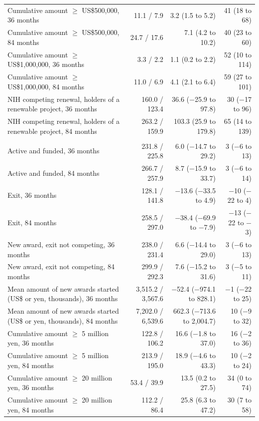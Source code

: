 \begin{table}[H]
\begin{tabularx}{\linewidth}{>{\raggedright\arraybackslash}Xrrr}
Cumulative amount $\geq$ US\$500,000, 36 months & 11.1 / 7.9 & 3.2 (1.5 to 5.2) & 41 (18 to 68) \\
Cumulative amount $\geq$ US\$500,000, 84 months & 24.7 / 17.6 & 7.1 (4.2 to 10.2) & 40 (23 to 60) \\
Cumulative amount $\geq$ US\$1,000,000, 36 months & 3.3 / 2.2 & 1.1 (0.2 to 2.2) & 52 (10 to 114) \\
Cumulative amount $\geq$ US\$1,000,000, 84 months & 11.0 / 6.9 & 4.1 (2.1 to 6.4) & 59 (27 to 101) \\
NIH competing renewal, holders of a renewable project, 36 months & 160.0 / 123.4 & 36.6 ($-$25.9 to 97.8) & 30 ($-$17 to 96) \\
NIH competing renewal, holders of a renewable project, 84 months & 263.2 / 159.9 & 103.3 (25.9 to 179.8) & 65 (14 to 139) \\
\multicolumn{4}{>{\raggedright\arraybackslash}p{\dimexpr\textwidth-2\tabcolsep\relax}}{\textit{JP 2014--2018, last authors}} \\
Active and funded, 36 months & 231.8 / 225.8 & 6.0 ($-$14.7 to 29.2) & 3 ($-$6 to 13) \\
Active and funded, 84 months & 266.7 / 257.9 & 8.7 ($-$15.9 to 33.7) & 3 ($-$6 to 14) \\
Exit, 36 months & 128.1 / 141.8 & $-$13.6 ($-$33.5 to 4.9) & $-$10 ($-$22 to 4) \\
Exit, 84 months & 258.5 / 297.0 & $-$38.4 ($-$69.9 to $-$7.9) & $-$13 ($-$22 to $-$3) \\
New award, exit not competing, 36 months & 238.0 / 231.4 & 6.6 ($-$14.4 to 29.0) & 3 ($-$6 to 13) \\
New award, exit not competing, 84 months & 299.9 / 292.3 & 7.6 ($-$15.2 to 31.6) & 3 ($-$5 to 11) \\
Mean amount of new awards started (US\$ or yen, thousands), 36 months & 3,515.2 / 3,567.6 & $-$52.4 ($-$974.1 to 828.1) & $-$1 ($-$22 to 25) \\
Mean amount of new awards started (US\$ or yen, thousands), 84 months & 7,202.0 / 6,539.6 & 662.3 ($-$713.6 to 2,004.7) & 10 ($-$9 to 32) \\
Cumulative amount $\geq$ 5 million yen, 36 months & 122.8 / 106.2 & 16.6 ($-$1.8 to 37.0) & 16 ($-$2 to 36) \\
Cumulative amount $\geq$ 5 million yen, 84 months & 213.9 / 195.0 & 18.9 ($-$4.6 to 43.3) & 10 ($-$2 to 24) \\
Cumulative amount $\geq$ 20 million yen, 36 months & 53.4 / 39.9 & 13.5 (0.2 to 27.5) & 34 (0 to 74) \\
Cumulative amount $\geq$ 20 million yen, 84 months & 112.2 / 86.4 & 25.8 (6.3 to 47.2) & 30 (7 to 58) \\
\bottomrule
\end{tabularx}
\end{table}

